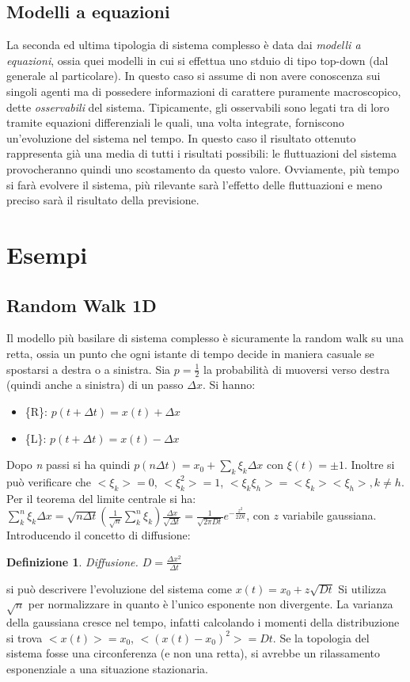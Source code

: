 \documentclass[12pt, a4paper]{book}
\theoremstyle{theorem}
\newtheorem{definition}{Definizione}[section]
\begin{document}
		\subsection{Modelli a equazioni}
			La seconda ed ultima tipologia di sistema complesso è data dai \emph{modelli a equazioni}, ossia quei modelli in cui si effettua uno stduio di tipo top-down (dal generale al particolare).
			In questo caso si assume di non avere conoscenza sui singoli agenti ma di possedere informazioni di carattere puramente macroscopico, dette \emph{osservabili} del sistema.
			Tipicamente, gli osservabili sono legati tra di loro tramite equazioni differenziali le quali, una volta integrate, forniscono un'evoluzione del sistema nel tempo.
			In questo caso il risultato ottenuto rappresenta già una media di tutti i risultati possibili: le fluttuazioni del sistema provocheranno quindi uno scostamento da questo valore.
			Ovviamente, più tempo si farà evolvere il sistema, più rilevante sarà l'effetto delle fluttuazioni e meno preciso sarà il risultato della previsione.

		\section{Esempi}
			\subsection{Random Walk 1D}
				Il modello più basilare di sistema complesso è sicuramente la random walk su una retta, ossia un punto che ogni istante di tempo decide in maniera casuale se spostarsi a destra o a sinistra.
				Sia $p=\frac{1}{2}$ la probabilità di muoversi verso destra (quindi anche a sinistra) di un passo $\Delta x$. Si hanno:
				\begin{itemize}
					\item \{R\}: $p(t+\Delta t)=x(t)+\Delta x$
					\item \{L\}: $p(t+\Delta t)=x(t)-\Delta x$
				\end{itemize}
				Dopo \textit{n} passi si ha quindi $p(n\Delta t)=x_0+\sum_k\xi_k\Delta x$ con $\xi(t)=\pm 1$.
				Inoltre si può verificare che $<\xi_k>=0$, $<\xi_k^2>=1$, $<\xi_k\xi_h>=<\xi_k><\xi_h>, k\neq h$.
				Per il teorema del limite centrale si ha:
				$\sum_k^n\xi_k\Delta x=\sqrt{n\Delta t}\left(\frac{1}{\sqrt{n}}\sum_k^n\xi_k\right)\frac{\Delta x}{\sqrt{\Delta t}}=\frac{1}{\sqrt{2\pi Dt}}e^{-\frac{z^2}{2Dt}}$, con $z$ variabile gaussiana.
				Introducendo il concetto di diffusione:\\
				\begin{definition}
					Diffusione. $D=\frac{\Delta x^2}{\Delta t}$
				\end{definition}
				si può descrivere l'evoluzione del sistema come $x(t)=x_0+z\sqrt{Dt}$
				Si utilizza $\sqrt{n}$ per normalizzare in quanto è l'unico esponente non divergente.
				La varianza della gaussiana cresce nel tempo, infatti calcolando i momenti della distribuzione si trova $<x(t)>=x_0$, $<(x(t)-x_0)^2>=Dt$.
				Se la topologia del sistema fosse una circonferenza (e non una retta), si avrebbe un rilassamento esponenziale a una situazione stazionaria.
\end{document}
